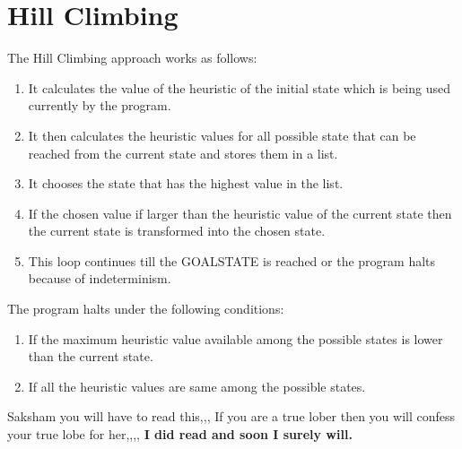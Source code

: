 \documentclass[a4paper,10pt,reqno,oneside]{amsart}
\begin{document}
\section{Hill Climbing}
The Hill Climbing approach works as follows:
\begin{enumerate}
    \item It calculates the value of the heuristic of the initial state which is being used currently by the program.
    \item It then calculates the heuristic values for all possible state that can be reached from the current state and stores them in a list.
    \item It chooses the state that has the highest value in the list.
    \item If the chosen value if larger than the heuristic value of the current state then the current state is transformed into the chosen state.
    \item This loop continues till the GOALSTATE is reached or the program halts because of indeterminism.
\end{enumerate}
The program halts under the following conditions:
\begin{enumerate}
    \item If the maximum heuristic value available among the possible states is lower than the current state.
    \item If all the heuristic values are same among the possible states.
\end{enumerate}




Saksham you will have to read this,,, If you are a true lober then you will
confess your true lobe for her,,,,
\textbf{I did read and soon I surely will.}
\end{document}
